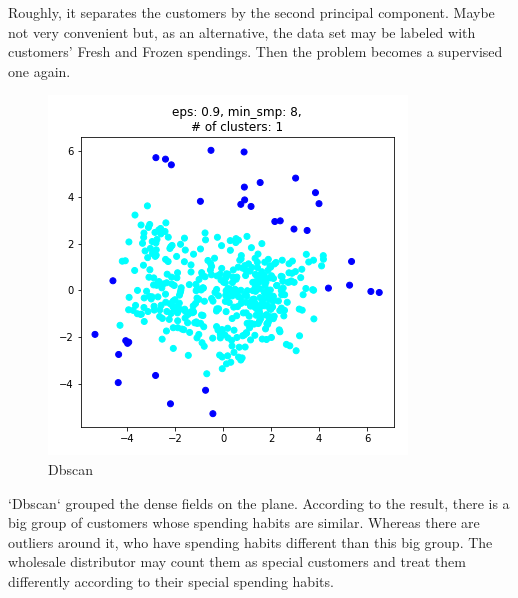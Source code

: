\documentclass[11pt]{article}
\makeatletter
\def\maxwidth{\ifdim\Gin@nat@width>\linewidth\linewidth
    \else\Gin@nat@width\fi}
\let\Oldincludegraphics\includegraphics
\renewcommand{\includegraphics}[1]{\Oldincludegraphics[width=.8\maxwidth]{#1}}
\makeatother
\begin{document}
    Roughly, it separates the customers by the second principal component.
Maybe not very convenient but, as an alternative, the data set may be
labeled with customers' Fresh and Frozen spendings. Then the problem
becomes a supervised one again.

    \begin{figure}
\centering
\includegraphics{img/dbscan_fav.png}
\caption{Dbscan}
\end{figure}

    `Dbscan` grouped the dense fields on the plane. According to the result,
there is a big group of customers whose spending habits are similar.
Whereas there are outliers around it, who have spending habits different
than this big group. The wholesale distributor may count them as special
customers and treat them differently according to their special spending
habits.


    
    
    
    
\end{document}

